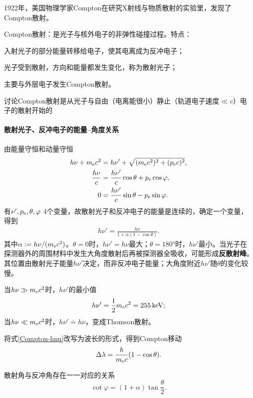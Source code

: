 1922年，美国物理学家Compton在研究X射线与物质散射的实验里，发现了Compton散射。

Compton散射：是光子与核外电子的非弹性碰撞过程。特点：
\begin{compactenum}
	\item 入射光子的部分能量转移给电子，使其电离成为反冲电子；
	\item 光子受到散射，方向和能量都发生变化，称为散射光子；
	\item 主要与外层电子发生Compton散射。
\end{compactenum}
讨论Compton散射是从光子与自由（电离能很小）静止（轨道电子速度$\ll c$）电子的散射开始的
\paragraph{散射光子、反冲电子的能量--角度关系}由能量守恒和动量守恒
\begin{align*}
	h\nu + m_{\mathrm{e}} c^2 &= h\nu' + \sqrt{(m_{\mathrm{e}} c^2)^2 + (p_{\mathrm{e}} c)^2},\\
	\frac{h\nu}c &= \frac{h\nu'}c\cos\theta + p_{\mathrm{e}}\cos\varphi,\\
	0 &= \frac{h\nu'}c\sin\theta - p_{\mathrm{e}}\sin\varphi.
\end{align*}
有$\nu',p_{\mathrm{e}},\theta,\varphi$ 4个变量，故散射光子和反冲电子的能量是连续的，确定一个变量，得到
\begin{align}\label{Compton-hnu}
	h\nu' = \frac{h\nu}{1 + \alpha(1 - \cos\theta)}.
\end{align}
其中$\alpha := h\nu/(m_{\mathrm{e}} c^2)$。$\theta = 0$时，$h\nu' = h\nu$最大；$\theta = \ang{180}$时，$h\nu'$最小。当光子在探测器外的周围材料中发生大角度散射后再被探测器全吸收，可能形成\textbf{反散射峰}。其位置由散射光子能量$h\nu'$决定，而非反冲电子能量；大角度附近$h\nu'$随$\theta$的变化较慢。

当$h\nu \gg m_{\mathrm{e}} c^2$时，$h\nu'$的最小值
\[
	h\nu' = \frac12m_{\mathrm{e}} c^2 = \qty{255}{keV};
\]
当$h\nu \ll m_{\mathrm{e}} c^2$时，$h\nu' \doteq h\nu$，变成Thomson散射。

将式\eqref{Compton-hnu}改写为波长的形式，得到Compton移动
\begin{align}
	\Delta\lambda = \frac h{m_{\mathrm{e}} c}(1 - \cos\theta).
\end{align}

散射角与反冲角存在一一对应的关系
\begin{equation}\label{eq:nrd-compton-recoil-angle}
	\cot\varphi = (1 + \alpha)\tan\frac\theta{2}.
\end{equation}

